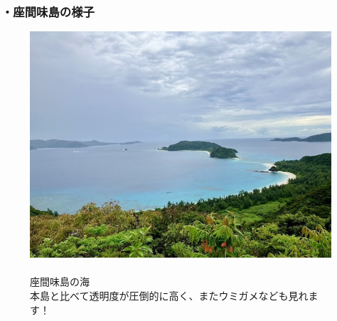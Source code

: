 \documentclass[../main]{subfiles}
\begin{document}
\subsubsection*{・座間味島の様子}
\begin{figure}[H]
  \begin{minipage}[b]{0.48\columnwidth}
    \centering
    \includegraphics[width=\columnwidth]{figure/zamamiumi.jpg}
  \end{minipage}
  \hspace{0.04\columnwidth} %
  \begin{minipage}[b]{0.48\columnwidth}
    \caption{\\
    座間味島の海\\
    本島と比べて透明度が圧倒的に高く、またウミガメなども見れます！
    }
  \end{minipage}
\end{figure}
\end{document}
